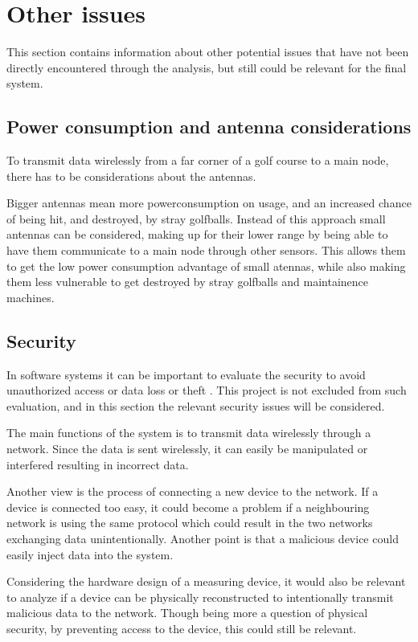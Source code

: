 \section{Other issues}
This section contains information about other potential issues that have not been directly encountered through the analysis, but still could be relevant for the final system.

\subsection{Power consumption and antenna considerations}
To transmit data wirelessly from a far corner of a golf course to a main node, there has to be considerations about the antennas. 

Bigger antennas mean more powerconsumption on usage, and an increased chance of being hit, and destroyed, by stray golfballs. Instead of this approach small antennas can be considered, making up for their lower range by being able to have them communicate to a main node through other sensors. This allows them to get the low power consumption advantage of small atennas, while also making them less vulnerable to get destroyed by stray golfballs and maintainence machines.

\subsection{Security}
In software systems it can be important to evaluate the security to avoid unauthorized access or data loss or theft . This project is not excluded from such evaluation, and in this section the relevant security issues will be considered.

The main functions of the system is to transmit data wirelessly through a network. Since the data is sent wirelessly, it can easily be manipulated or interfered resulting in incorrect data.

Another view is the process of connecting a new device to the network. If a device is connected too easy, it could become a problem if a neighbouring network is using the same protocol which could result in the two networks exchanging data unintentionally. Another point is that a malicious device could easily inject data into the system.

Considering the hardware design of a measuring device, it would also be relevant to analyze if a device can be physically reconstructed to intentionally transmit malicious data to the network. Though being more a question of physical security, by preventing access to the device, this could still be relevant.

